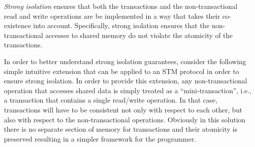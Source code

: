 \documentclass[runningheads,a4paper]{article}
\begin{document}
\emph{Strong isolation} ensures that  
both the  transactions  and  the non-transactional
read and write operations are be implemented in a way  
that  takes their co-existence  into account.
Specifically, strong isolation ensures that the non-transactional accesses to shared memory
do not violate the atomicity of the transactions.

In order to better understand strong isolation guarantees, consider
the following simple intuitive extension that can be applied to an STM protocol
in order to ensure strong isolation.
In order to provide this extension, any non-transactional operation that 
accesses shared data is simply treated as a ``mini-transaction'', i.e., a transaction  that contains a
single read/write operation. In that case,  transactions  will have to  be  
consistent  not only with 
respect to each other, but 
also with respect to the  non-transactional operations.
Obviously in this solution there is no separate section of memory for transactions
and their atomicity is preserved resulting in a simpler framework for
the programmer.
\end{document}
